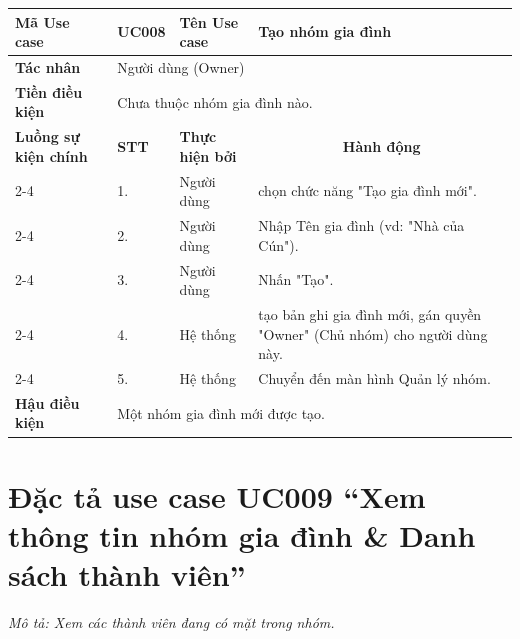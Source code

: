 \begingroup
\renewcommand{\arraystretch}{1.5}

\begin{longtable}{|p{2.7cm}|p{0.8cm}|p{2.6cm}|p{7.3cm}|}
\hline
\cellcolor[HTML]{D5F5E3}\textbf{Mã Use case} & \multicolumn{1}{l|}{UC008} & \cellcolor[HTML]{D5F5E3}\textbf{Tên Use case} & Tạo nhóm gia đình \\ \hline
\cellcolor[HTML]{D5F5E3}\textbf{Tác nhân} & \multicolumn{3}{p{10.7cm}|}{Người dùng (Owner)} \\ \hline
\cellcolor[HTML]{D5F5E3}\textbf{Tiền điều kiện} & \multicolumn{3}{p{10.7cm}|}{Chưa thuộc nhóm gia đình nào.} \\ \hline

\cellcolor[HTML]{D5F5E3}\textbf{Luồng sự kiện chính} & \cellcolor[HTML]{FDEBD0}\textbf{STT} & \cellcolor[HTML]{FDEBD0}\textbf{Thực hiện bởi} & \multicolumn{1}{c|}{\cellcolor[HTML]{FDEBD0}\textbf{Hành động}} \\ \cline{2-4} 
\cellcolor[HTML]{D5F5E3} & 1. & Người dùng & chọn chức năng "Tạo gia đình mới". \\ \cline{2-4} 
\cellcolor[HTML]{D5F5E3} & 2. & Người dùng & Nhập Tên gia đình (vd: "Nhà của Cún"). \\ \cline{2-4} 
\cellcolor[HTML]{D5F5E3} & 3. & Người dùng & Nhấn "Tạo". \\ \cline{2-4} 
\cellcolor[HTML]{D5F5E3} & 4. & Hệ thống & tạo bản ghi gia đình mới, gán quyền "Owner" (Chủ nhóm) cho người dùng này. \\ \cline{2-4} 
\cellcolor[HTML]{D5F5E3} & 5. & Hệ thống & Chuyển đến màn hình Quản lý nhóm. \\ \hline

\cellcolor[HTML]{D5F5E3}\textbf{Hậu điều kiện} & \multicolumn{3}{p{10.7cm}|}{Một nhóm gia đình mới được tạo.} \\ \hline
\end{longtable}
\endgroup

\section{Đặc tả use case UC009 ``Xem thông tin nhóm gia đình \& Danh sách thành viên''}
\textit{Mô tả: Xem các thành viên đang có mặt trong nhóm.}
\vspace{0.5cm}

